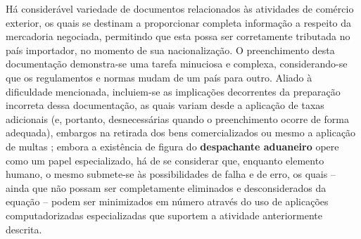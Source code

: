 Há considerável variedade de documentos relacionados às atividades de comércio exterior, os quais se destinam a proporcionar completa informação a respeito da mercadoria negociada, permitindo que esta possa ser corretamente tributada no país importador, no momento de sua nacionalização. O preenchimento desta documentação demonstra-se uma tarefa minuciosa e complexa, considerando-se que os regulamentos e normas mudam de um país para outro. Aliado à dificuldade mencionada, incluiem-se as implicações decorrentes da preparação incorreta dessa documentação, as quais variam desde a aplicação de taxas adicionais (e, portanto, desnecessárias quando o preenchimento ocorre de forma adequada), embargos na retirada dos bens comercializados ou mesmo a aplicação de multas \cite{segalis2015fundamentos}; embora a existência de figura do \textbf{despachante aduaneiro} opere como um papel especializado, há de se considerar que, enquanto elemento humano, o mesmo submete-se às possibilidades de falha e de erro, os quais -- ainda que não possam ser completamente eliminados e desconsiderados da equação -- podem ser minimizados em número através do uso de aplicações computadorizadas especializadas que suportem a atividade anteriormente descrita.
